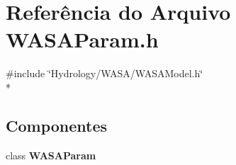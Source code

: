 \section{Referência do Arquivo W\+A\+S\+A\+Param.\+h}
\label{_w_a_s_a_param_8h}
{\ttfamily \#include \char`\"{}Hydrology/\+W\+A\+S\+A/\+W\+A\+S\+A\+Model.\+h\char`\"{}}\\*
\subsection*{Componentes}
\begin{DoxyCompactItemize}
\item 
class {\bf W\+A\+S\+A\+Param}
\end{DoxyCompactItemize}
